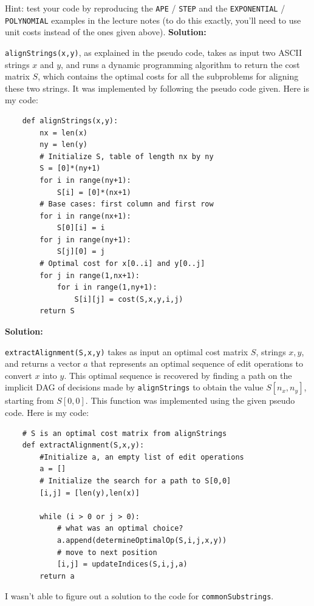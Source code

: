 \documentclass{article}
\begin{document}
\begin{enumerate}
\begin{enumerate}
	Hint: test your code by reproducing the {\tt APE} / {\tt STEP} and the {\tt EXPONENTIAL} / {\tt POLYNOMIAL} examples in the lecture notes (to do this exactly, you'll need to use unit costs instead of the ones given above).
	\textbf{Solution:}\par
	{\tt alignStrings(x,y)}, as explained in the pseudo code, takes as input two ASCII strings $x$ and $y$, and runs a 
	dynamic programming algorithm to return the cost matrix $S$, which contains the optimal costs for all the subproblems 
	for aligning these two strings. It was implemented by following the pseudo code given. Here is my code:\par
	\begin{lstlisting}
	def alignStrings(x,y):
		nx = len(x)
		ny = len(y)
		# Initialize S, table of length nx by ny
		S = [0]*(ny+1)
		for i in range(ny+1):
			S[i] = [0]*(nx+1)
		# Base cases: first column and first row
		for i in range(nx+1):
			S[0][i] = i
		for j in range(ny+1):
			S[j][0] = j
		# Optimal cost for x[0..i] and y[0..j]
		for j in range(1,nx+1):
			for i in range(1,ny+1):
				S[i][j] = cost(S,x,y,i,j)
		return S
	\end{lstlisting}
	\par
	\textbf{Solution:}\par
	{\tt extractAlignment(S,x,y)} takes as input an optimal cost matrix $S$, strings $x,y$, and returns a vector $a$ that represents an optimal sequence of edit operations to convert $x$ into $y$. 
	This optimal sequence is recovered by finding a path on the implicit DAG of decisions made by {\tt alignStrings} to obtain the 
	value $S[n_{x},n_{y}]$, starting from $S[0,0]$. This function was implemented using the given pseudo code. Here is my code:\par
	\begin{lstlisting}
	# S is an optimal cost matrix from alignStrings
	def extractAlignment(S,x,y):
		#Initialize a, an empty list of edit operations
		a = []
		# Initialize the search for a path to S[0,0]
		[i,j] = [len(y),len(x)]
	
		while (i > 0 or j > 0):
			# what was an optimal choice?
			a.append(determineOptimalOp(S,i,j,x,y))
			# move to next position
			[i,j] = updateIndices(S,i,j,a)
		return a
	\end{lstlisting}\par
	I wasn't able to figure out a solution to the code for {\tt commonSubstrings}.\par


\end{enumerate}
\end{enumerate}
\end{document}
